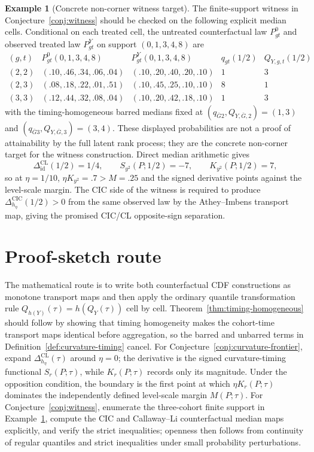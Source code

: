 \documentclass[11pt]{article}
\theoremstyle{definition}
\newtheorem{example}{Example}
\theoremstyle{plain}
\theoremstyle{remark}
\begin{document}
\begin{example}[Concrete non-corner witness target]\label{ex:three-cohort-witness}
The finite-support witness in Conjecture~\ref{conj:witness} should be checked on
the following explicit median cells.  Conditional on each treated cell, the
untreated counterfactual law \(P^0_{gt}\) and observed treated law \(P^Y_{gt}\)
on support \((0,1,3,4,8)\) are
\[
\begin{array}{c|cc|cc}
(g,t) & P^0_{gt}(0,1,3,4,8) & P^Y_{gt}(0,1,3,4,8) & q_{gt}(1/2) & Q_{Y,g,t}(1/2)\\
\hline
(2,2) & (.10,.46,.34,.06,.04) & (.10,.20,.40,.20,.10) & 1 & 3\\
(2,3) & (.08,.18,.22,.01,.51) & (.10,.45,.25,.10,.10) & 8 & 1\\
(3,3) & (.12,.44,.32,.08,.04) & (.10,.20,.42,.18,.10) & 1 & 3
\end{array}
\]
with the timing-homogeneous barred medians fixed at
\((q_{\bar G2},Q_{Y,\bar G,2})=(1,3)\) and
\((q_{\bar G3},Q_{Y,\bar G,3})=(3,4)\).  These displayed probabilities are not
a proof of attainability by the full latent rank process; they are the concrete
non-corner target for the witness construction.  Direct median arithmetic gives
\[
\Delta^{\mathrm{CL}}_{\mathrm{id}}(1/2)=1/4,\qquad
S_{y^2}(P;1/2)=-7,\qquad
K_{y^2}(P;1/2)=7,
\]
so at \(\eta=1/10\), \(\eta K_{y^2}=.7>M=.25\) and the signed derivative points
against the level-scale margin.  The CIC side of the witness is required to
produce \(\Delta^{\mathrm{CIC}}_{h_\eta}(1/2)>0\) from the same observed law by
the Athey--Imbens transport map, giving the promised CIC/CL opposite-sign
separation.
\end{example}

\section{Proof-sketch route}
The mathematical route is to write both counterfactual CDF constructions as
monotone transport maps and then apply the ordinary quantile transformation rule
\(Q_{h(Y)}(\tau)=h(Q_Y(\tau))\) cell by cell.  Theorem~\ref{thm:timing-homogeneous}
should follow by showing that timing homogeneity makes the cohort-time transport
maps identical before aggregation, so the barred and unbarred terms in
Definition~\ref{def:curvature-timing} cancel.  For
Conjecture~\ref{conj:curvature-frontier}, expand
\(\Delta^{\mathrm{CL}}_{h_\eta}(\tau)\) around \(\eta=0\); the derivative is the
signed curvature-timing functional \(S_r(P;\tau)\), while \(K_r(P;\tau)\) records
only its magnitude.  Under the opposition condition, the boundary is the first
point at which \(\eta K_r(P;\tau)\) dominates the independently defined
level-scale margin \(M(P;\tau)\).  For Conjecture~\ref{conj:witness}, enumerate
the three-cohort finite support in Example~\ref{ex:three-cohort-witness}, compute
the CIC and Callaway--Li counterfactual median maps explicitly, and verify the
strict inequalities; openness then follows from continuity of regular quantiles
and strict inequalities under small probability perturbations.
\end{document}
